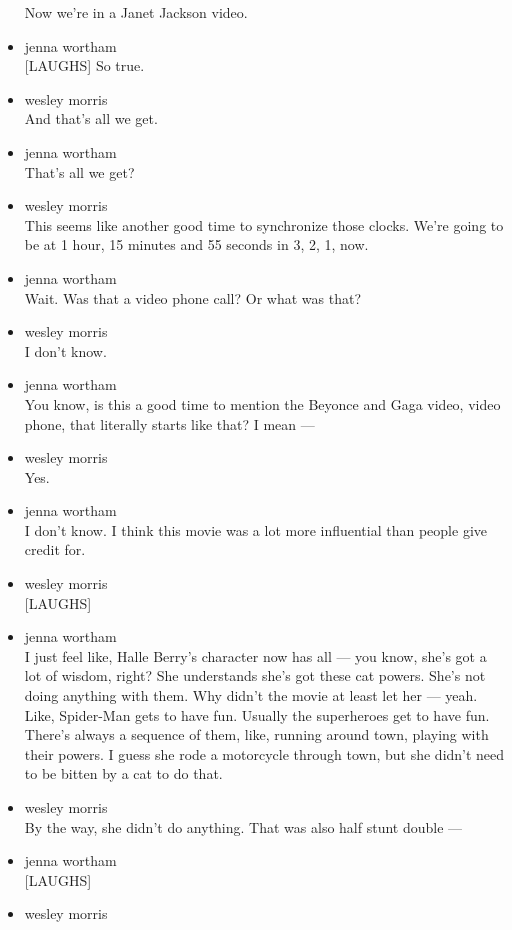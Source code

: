 \begin{itemize}
  Now we're in a Janet Jackson video.
\item
  jenna wortham\\
  {[}LAUGHS{]} So true.
\item
  wesley morris\\
  And that's all we get.
\item
  jenna wortham\\
  That's all we get?
\item
  wesley morris\\
  This seems like another good time to synchronize those clocks. We're
  going to be at 1 hour, 15 minutes and 55 seconds in 3, 2, 1, now.
\item
  jenna wortham\\
  Wait. Was that a video phone call? Or what was that?
\item
  wesley morris\\
  I don't know.
\item
  jenna wortham\\
  You know, is this a good time to mention the Beyonce and Gaga video,
  video phone, that literally starts like that? I mean ---
\item
  wesley morris\\
  Yes.
\item
  jenna wortham\\
  I don't know. I think this movie was a lot more influential than
  people give credit for.
\item
  wesley morris\\
  {[}LAUGHS{]}
\item
  jenna wortham\\
  I just feel like, Halle Berry's character now has all --- you know,
  she's got a lot of wisdom, right? She understands she's got these cat
  powers. She's not doing anything with them. Why didn't the movie at
  least let her --- yeah. Like, Spider-Man gets to have fun. Usually the
  superheroes get to have fun. There's always a sequence of them, like,
  running around town, playing with their powers. I guess she rode a
  motorcycle through town, but she didn't need to be bitten by a cat to
  do that.
\item
  wesley morris\\
  By the way, she didn't do anything. That was also half stunt double
  ---
\item
  jenna wortham\\
  {[}LAUGHS{]}
\item
  wesley morris\\

\end{itemize}

